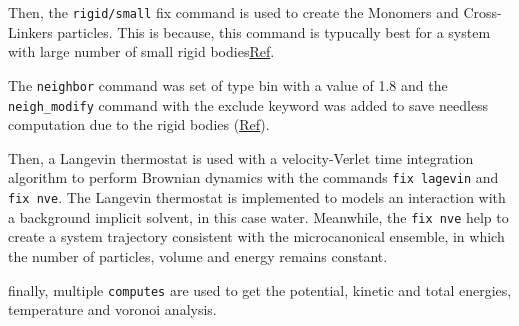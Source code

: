 \documentclass[main.tex]{subfiles}
\begin{document}
Then, the \verb|rigid/small| fix command is used to create the Monomers and Cross-Linkers particles.
This is because, this command is typucally best for a system with large number of small rigid bodies\href{https://docs.lammps.org/fix_rigid.html}{Ref}.

The \verb|neighbor| command was set of type bin with a value of 1.8 and the \verb|neigh_modify| command with the exclude keyword was added to save needless computation due to the rigid bodies (\href{https://docs.lammps.org/neigh_modify.html}{Ref}).

Then, a Langevin thermostat is used with a velocity-Verlet time integration algorithm to perform Brownian dynamics with the commands \verb|fix lagevin| and \verb|fix nve|.
The Langevin thermostat is implemented to models an interaction with a background implicit solvent, in this case water.
Meanwhile, the \verb|fix nve| help to create a system trajectory consistent with the microcanonical ensemble, in which the number of particles, volume and energy remains constant.

finally, multiple \verb|computes| are used to get the potential, kinetic and total energies, temperature and voronoi analysis.
\end{document}
